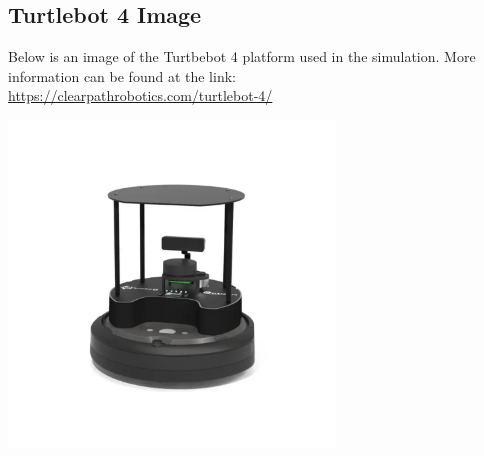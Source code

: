 \subsection{Turtlebot 4 Image}
Below is an image of the Turtbebot 4 platform used in the simulation. 
More information can be found at the link: \\
\url{https://clearpathrobotics.com/turtlebot-4/}
\begin{center}
    \includegraphics[width=0.65\textwidth]{figures/tb4.png}
\end{center}


\newpage
